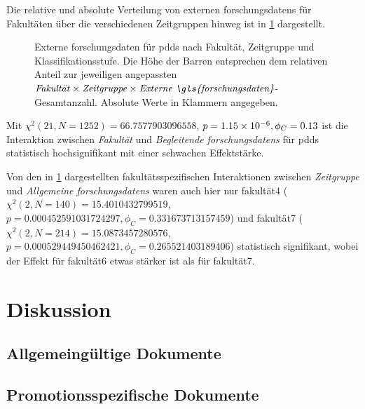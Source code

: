 Die relative und absolute Verteilung von externen \glspl{forschungsdaten} für Fakultäten über die verschiedenen Zeitgruppen hinweg ist in \cref{fig:luh-repo_fakultät_x_zeitgruppe_x_externe-fd} dargestellt.
\begin{figure}[!htbp]
    \resizebox{\ifdim\width>\textwidth\textwidth\else\width\fi}{!}{}
    \caption{Externe \gls{forschungsdaten} für \glspl{pdd} nach Fakultät, Zeitgruppe und Klassifikationsstufe.
    Die Höhe der Barren entsprechen dem relativen Anteil zur jeweiligen angepassten $\text{\textit{Fakultät}}\times\text{\textit{Zeitgruppe}}\times\text{\textit{Externe \gls{forschungsdaten}}}$-Gesamtanzahl.
    Absolute Werte in Klammern angegeben.}
    \label{fig:luh-repo_fakultät_x_zeitgruppe_x_externe-fd}
\end{figure}
Mit $\chi^2 (\num{21}, N = \num{1252}) = \num[round-mode=places,round-precision=2]{66.7577903096558}$, $p = \num[round-mode=places,round-precision=2]{1.1517458402742E-06},\phi_C=\num[round-mode=places,round-precision=2]{0.133317814235608}$ ist die Interaktion zwischen \textit{Fakultät} und \textit{Begleitende \glspl{forschungsdaten}} für \glspl{pdd} statistisch hochsignifikant mit einer schwachen Effektstärke.

Von den in \cref{fig:luh-repo_fakultät_x_zeitgruppe_x_externe-fd} dargestellten fakultätsspezifischen Interaktionen zwischen \textit{Zeitgruppe} und \textit{Allgemeine \glspl{forschungsdaten}} waren auch hier nur \gls{fakultät4} ($\chi^2 (\num{2}, N = \num{140}) = \num[round-mode=places,round-precision=2]{15.4010432799519}$, $p = \num[round-mode=places,round-precision=4]{0.000452591031724297},\phi_C=\num[round-mode=places,round-precision=2]{0.331673713157459}$) und \gls{fakultät7} ($\chi^2 (\num{2}, N = \num{214}) = \num[round-mode=places,round-precision=2]{15.0873457280576}$, $p = \num[round-mode=places,round-precision=3]{0.000529449450462421},\phi_C=\num[round-mode=places,round-precision=2]{0.265521403189406}$) statistisch signifikant, wobei der Effekt für \gls{fakultät6} etwas stärker ist als für \gls{fakultät7}.




\section{Diskussion}\label{sec:luh-repo-discussion}
\subsection{Allgemeingültige Dokumente}\label{sec:luh-repo-discussion-general}
\subsection{Promotionsspezifische Dokumente}\label{sec:luh-repo-discussion-specific}

